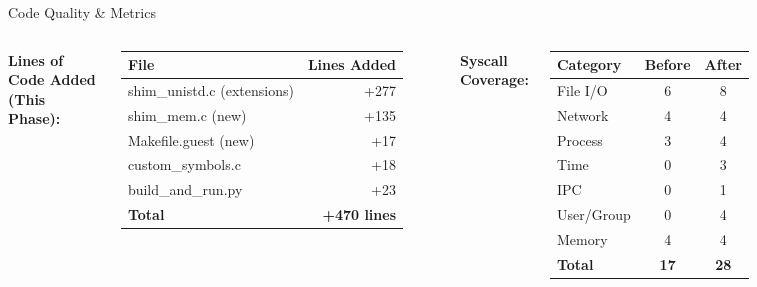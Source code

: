 \documentclass[aspectratio=169, 10pt]{beamer}
\begin{document}
\begin{frame}{Code Quality & Metrics}
    \begin{columns}[T]
        \textbf{Lines of Code Added (This Phase):}
        \vspace{0.1cm}
        \begin{table}
            \tiny
            \begin{tabular}{@{}lr@{}}
                \toprule
                \textbf{File} & \textbf{Lines Added} \\
                \midrule
                shim\_unistd.c (extensions) & +277 \\
                shim\_mem.c (new) & +135 \\
                Makefile.guest (new) & +17 \\
                custom\_symbols.c & +18 \\
                build\_and\_run.py & +23 \\
                \midrule
                \textbf{Total} & \textbf{+470 lines} \\
                \bottomrule
            \end{tabular}
        \end{table}

        \textbf{Syscall Coverage:}
        \vspace{0.1cm}
        \begin{table}
            \tiny
            \begin{tabular}{@{}lcc@{}}
                \toprule
                \textbf{Category} & \textbf{Before} & \textbf{After} \\
                \midrule
                File I/O & 6 & 8 \\
                Network & 4 & 4 \\
                Process & 3 & 4 \\
                Time & 0 & 3 \\
                IPC & 0 & 1 \\
                User/Group & 0 & 4 \\
                Memory & 4 & 4 \\
                \midrule
                \textbf{Total} & \textbf{17} & \textbf{28} \\
                \bottomrule
            \end{tabular}
        \end{table}
    \end{columns}


\end{frame}
\end{document}
